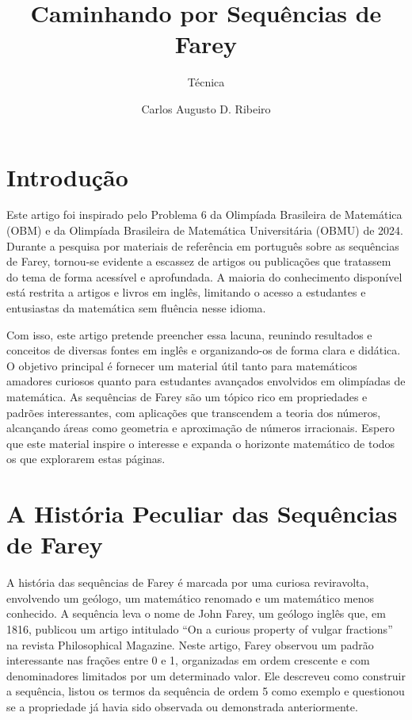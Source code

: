 \documentclass{hipatia}
\title{ \fontsize{28}{28}\selectfont Caminhando por Sequências de Farey}
\subtitle{Técnica}
\author{Carlos Augusto D. Ribeiro}
\theoremstyle{definition} %
\begin{document}
\maketitle

\section{Introdução}

Este artigo foi inspirado pelo Problema 6 da Olimpíada Brasileira de Matemática (OBM) e da Olimpíada Brasileira de Matemática Universitária (OBMU) de 2024. Durante a pesquisa por materiais de referência em português sobre as sequências de Farey, tornou-se evidente a escassez de artigos ou publicações que tratassem do tema de forma acessível e aprofundada. A maioria do conhecimento disponível está restrita a artigos e livros em inglês, limitando o acesso a estudantes e entusiastas da matemática sem fluência nesse idioma.

Com isso, este artigo pretende preencher essa lacuna, reunindo resultados e conceitos de diversas fontes em inglês e organizando-os de forma clara e didática. O objetivo principal é fornecer um material útil tanto para matemáticos amadores curiosos quanto para estudantes avançados envolvidos em olimpíadas de matemática. As sequências de Farey são um tópico rico em propriedades e padrões interessantes, com aplicações que transcendem a teoria dos números, alcançando áreas como geometria e aproximação de números irracionais. Espero que este material inspire o interesse e expanda o horizonte matemático de todos os que explorarem estas páginas.

\section{A História Peculiar das Sequências de Farey}
A história das sequências de Farey é marcada por uma curiosa reviravolta, envolvendo um geólogo, um matemático renomado e um matemático menos conhecido. A sequência leva o nome de John Farey, um geólogo inglês que, em 1816, publicou um artigo intitulado ``On a curious property of vulgar fractions'' na revista Philosophical Magazine. Neste artigo, Farey observou um padrão interessante nas frações entre 0 e 1, organizadas em ordem crescente e com denominadores limitados por um determinado valor. Ele descreveu como construir a sequência, listou os termos da sequência de ordem 5 como exemplo e questionou se a propriedade já havia sido observada ou demonstrada anteriormente.
\end{document}
